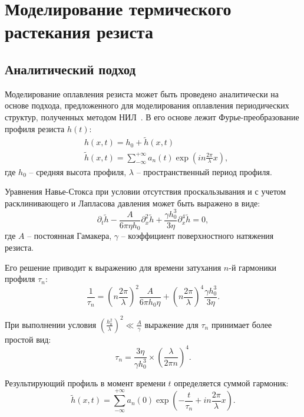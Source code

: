 \section{Моделирование термического растекания резиста}


\subsection{Аналитический подход}
Моделирование оплавления резиста может быть проведено аналитически на основе подхода, предложенного для моделирования оплавления периодических структур, полученных методом НИЛ~\cite{Leveder_2008, Leveder_2011}. В его основе лежит Фурье-преобразование профиля резиста $h(t)$:
\begin{equation}
	\begin{aligned}
		& h(x, t) = h_0 + \tilde{h}(x, t) \\
		& \tilde{h}(x, t) = \sum_{-\infty}^{+\infty} a_n(t) \exp \left(i n \frac{2 \pi}{\lambda} x\right),
	\end{aligned}
\end{equation}
где $h_0$ -- средняя высота профиля, $\lambda$ -- пространственный период профиля.

Уравнения Навье-Стокса при условии отсутствия проскальзывания и с учетом расклинивающего и Лапласова давления может быть выражено в виде:
\begin{equation}
	\partial_t \tilde{h}-\frac{A}{6 \pi \eta h_0} \partial_x^2 \tilde{h}+\frac{\gamma h_0^3}{3 \eta} \partial_x^4 \tilde{h} = 0,
\end{equation}
где $A$ -- постоянная Гамакера, $\gamma$ -- коэффициент поверхностного натяжения резиста.

Его решение приводит к выражению для времени затухания $n$-й гармоники профиля $\tau_n$:
\begin{equation}
	\frac{1}{\tau_n}=\left(n \frac{2 \pi}{\lambda}\right)^2 \frac{A}{6 \pi h_0 \eta}+\left(n \frac{2 \pi}{\lambda}\right)^4 \frac{\gamma h_0^3}{3 \eta}.
\end{equation}

При выполнении условия $\left(\frac{\displaystyle h_0^2}{\displaystyle \lambda}\right)^2 \ll \frac{\displaystyle A}{\displaystyle \gamma}$ выражение для $\tau_n$ принимает более простой вид:
\begin{equation}
	\tau_n=\frac{3 \eta}{\gamma h_0^3} \times\left(\frac{\lambda}{2 \pi n}\right)^4.
\end{equation}

Результирующий профиль в момент времени $t$ определяется суммой гармоник:
\begin{equation}
	\tilde{h}(x, t)=\sum_{-\infty}^{+\infty} a_n(0) \exp \left(-\frac{t}{\tau_n}+i n \frac{2 \pi}{\lambda} x\right).
\end{equation}

